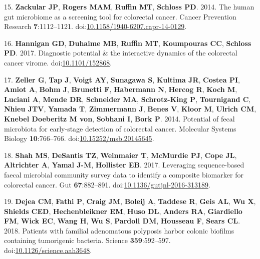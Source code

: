 \documentclass[11pt,]{article}
\begin{document}
\leavevmode\hypertarget{ref-Zackular2014}{}%
15. \textbf{Zackular JP}, \textbf{Rogers MAM}, \textbf{Ruffin MT},
\textbf{Schloss PD}. 2014. The human gut microbiome as a screening tool
for colorectal cancer. Cancer Prevention Research \textbf{7}:1112--1121.
doi:\href{https://doi.org/10.1158/1940-6207.capr-14-0129}{10.1158/1940-6207.capr-14-0129}.

\leavevmode\hypertarget{ref-Hannigan2017}{}%
16. \textbf{Hannigan GD}, \textbf{Duhaime MB}, \textbf{Ruffin MT},
\textbf{Koumpouras CC}, \textbf{Schloss PD}. 2017. Diagnostic potential
\& the interactive dynamics of the colorectal cancer virome.
doi:\href{https://doi.org/10.1101/152868}{10.1101/152868}.

\leavevmode\hypertarget{ref-Zeller2014}{}%
17. \textbf{Zeller G}, \textbf{Tap J}, \textbf{Voigt AY},
\textbf{Sunagawa S}, \textbf{Kultima JR}, \textbf{Costea PI},
\textbf{Amiot A}, \textbf{Bohm J}, \textbf{Brunetti F},
\textbf{Habermann N}, \textbf{Hercog R}, \textbf{Koch M},
\textbf{Luciani A}, \textbf{Mende DR}, \textbf{Schneider MA},
\textbf{Schrotz-King P}, \textbf{Tournigand C}, \textbf{Nhieu JTV},
\textbf{Yamada T}, \textbf{Zimmermann J}, \textbf{Benes V},
\textbf{Kloor M}, \textbf{Ulrich CM}, \textbf{Knebel Doeberitz M von},
\textbf{Sobhani I}, \textbf{Bork P}. 2014. Potential of fecal microbiota
for early-stage detection of colorectal cancer. Molecular Systems
Biology \textbf{10}:766--766.
doi:\href{https://doi.org/10.15252/msb.20145645}{10.15252/msb.20145645}.

\leavevmode\hypertarget{ref-Shah2017}{}%
18. \textbf{Shah MS}, \textbf{DeSantis TZ}, \textbf{Weinmaier T},
\textbf{McMurdie PJ}, \textbf{Cope JL}, \textbf{Altrichter A},
\textbf{Yamal J-M}, \textbf{Hollister EB}. 2017. Leveraging
sequence-based faecal microbial community survey data to identify a
composite biomarker for colorectal cancer. Gut \textbf{67}:882--891.
doi:\href{https://doi.org/10.1136/gutjnl-2016-313189}{10.1136/gutjnl-2016-313189}.

\leavevmode\hypertarget{ref-Dejea2018}{}%
19. \textbf{Dejea CM}, \textbf{Fathi P}, \textbf{Craig JM},
\textbf{Boleij A}, \textbf{Taddese R}, \textbf{Geis AL}, \textbf{Wu X},
\textbf{Shields CED}, \textbf{Hechenbleikner EM}, \textbf{Huso DL},
\textbf{Anders RA}, \textbf{Giardiello FM}, \textbf{Wick EC},
\textbf{Wang H}, \textbf{Wu S}, \textbf{Pardoll DM}, \textbf{Housseau
F}, \textbf{Sears CL}. 2018. Patients with familial adenomatous
polyposis harbor colonic biofilms containing tumorigenic bacteria.
Science \textbf{359}:592--597.
doi:\href{https://doi.org/10.1126/science.aah3648}{10.1126/science.aah3648}.
\end{document}
